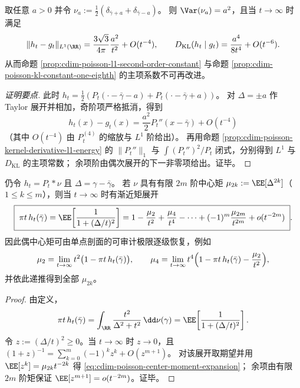 \begin{proposition}\label{prop:cdim-poisson-constants-sharpness}
取任意 \(a>0\) 并令
\(
\nu_a:=\frac12(\delta_{\bar\gamma+a}+\delta_{\bar\gamma-a})
\)。
则 \(\Var(\nu_a)=a^2\)，且当 \(t\to\infty\) 时满足
\[
\|h_t-g_t\|_{L^{1}(\RR)}=\frac{3\sqrt3}{4\pi}\frac{a^2}{t^2}+O(t^{-4}),
\qquad
D_{\mathrm{KL}}(h_t\mid g_t)=\frac{a^4}{8t^4}+O(t^{-6}).
\]
从而命题 \ref{prop:cdim-poisson-l1-second-order-constant} 与命题 \ref{prop:cdim-poisson-kl-constant-one-eighth} 的主项系数不可再改进。
\end{proposition}
\begin{proof}[证明要点]
此时
\(
h_t=\frac12(P_t(\cdot-\bar\gamma-a)+P_t(\cdot-\bar\gamma+a))
\)。
对 \(\Delta=\pm a\) 作 Taylor 展开并相加，奇阶项严格抵消，得到
\[
h_t(x)-g_t(x)=\frac{a^2}{2}P_t''(x-\bar\gamma)+O(t^{-4})
\]
（其中 \(O(t^{-4})\) 由 \(P_t^{(4)}\) 的缩放与 \(L^{1}\) 阶给出）。
再用命题 \ref{prop:cdim-poisson-kernel-derivative-l1-energy} 的 \(\|P_t''\|_{1}\) 与 \(\int (P_t'')^2/P_t\) 闭式，分别得到 \(L^{1}\) 与 \(D_{\mathrm{KL}}\) 的主项常数；
余项阶由偶次展开的下一非零项给出。证毕。
\end{proof}

\begin{proposition}\label{prop:cdim-poisson-center-moment-spectrum}
仍令 \(h_t=P_t*\nu\) 且 \(\Delta=\gamma-\bar\gamma\)。
若 \(\nu\) 具有有限 \(2m\) 阶中心矩 \(\mu_{2k}:=\EE[\Delta^{2k}]\)（\(1\le k\le m\)），则当 \(t\to\infty\) 时有渐近矩展开
\begin{equation}\label{eq:cdim-poisson-center-moment-expansion}
\boxed{\;
\pi t\,h_t(\bar\gamma)
=\EE\!\left[\frac{1}{1+(\Delta/t)^2}\right]
=1-\frac{\mu_2}{t^2}+\frac{\mu_4}{t^4}-\cdots+(-1)^m\frac{\mu_{2m}}{t^{2m}}+o(t^{-2m})\; }.
\end{equation}
因此偶中心矩可由单点剖面的可审计极限逐级恢复，例如
\[
\mu_{2}=\lim_{t\to\infty}t^{2}\bigl(1-\pi t\,h_t(\bar\gamma)\bigr),\qquad
\mu_{4}=\lim_{t\to\infty}t^{4}\Bigl(1-\pi t\,h_t(\bar\gamma)-\frac{\mu_{2}}{t^{2}}\Bigr),
\]
并依此递推得到全部 \(\mu_{2k}\)。
\end{proposition}
\begin{proof}
由定义，
\[
\pi t\,h_t(\bar\gamma)
=\int_{\RR}\frac{t^2}{\Delta^2+t^2}\,\dd\nu(\gamma)
=\EE\!\left[\frac{1}{1+(\Delta/t)^2}\right].
\]
令 \(z:=(\Delta/t)^2\ge 0\)。当 \(t\to\infty\) 时 \(z\to 0\)，且
\(
(1+z)^{-1}=\sum_{k=0}^{m}(-1)^k z^k+O(z^{m+1})
\)。
对该展开取期望并用 \(\EE[z^k]=\mu_{2k}t^{-2k}\) 得 \eqref{eq:cdim-poisson-center-moment-expansion}；
余项由有限 \(2m\) 阶矩保证 \(\EE[z^{m+1}]=o(t^{-2m})\)。证毕。
\end{proof}

